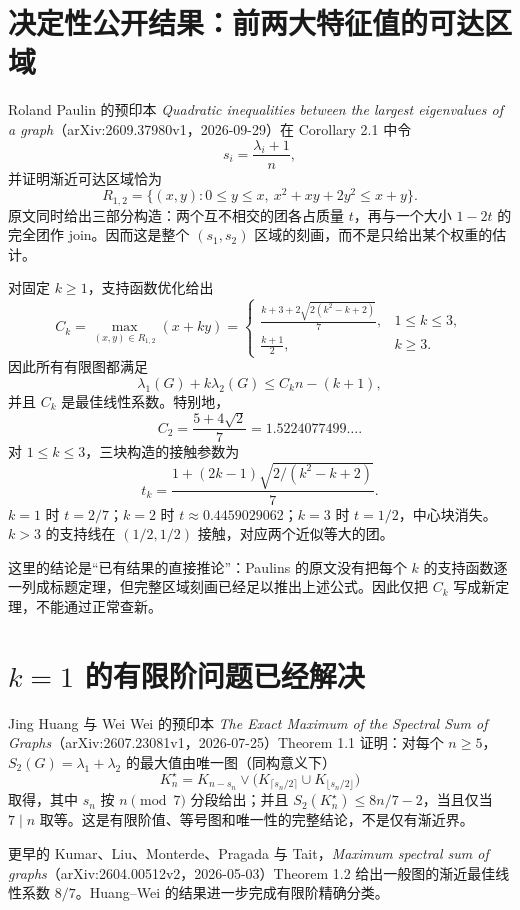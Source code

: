 \documentclass[11pt,a4paper]{article}
\begin{document}
\section{决定性公开结果：前两大特征值的可达区域}
Roland Paulin 的预印本 \emph{Quadratic inequalities between the largest eigenvalues of a graph}（arXiv:2609.37980v1，2026-09-29）在 Corollary 2.1 中令
\[
 s_i=\frac{\lambda_i+1}{n},
\]
并证明渐近可达区域恰为
\[
 R_{1,2}=\{(x,y):0\le y\le x,\ x^2+xy+2y^2\le x+y\}.
\]
原文同时给出三部分构造：两个互不相交的团各占质量 $t$，再与一个大小 $1-2t$ 的完全团作 join。因而这是整个 $(s_1,s_2)$ 区域的刻画，而不是只给出某个权重的估计。

对固定 $k\ge1$，支持函数优化给出
\[
 C_k=\max_{(x,y)\in R_{1,2}}(x+ky)=
 \begin{cases}
 \displaystyle\frac{k+3+2\sqrt{2(k^2-k+2)}}7,&1\le k\le3,\\[6pt]
 \displaystyle\frac{k+1}2,&k\ge3.
 \end{cases}
\]
因此所有有限图都满足
\[
 \lambda_1(G)+k\lambda_2(G)\le C_k n-(k+1),
\]
并且 $C_k$ 是最佳线性系数。特别地，
\[
 C_2=\frac{5+4\sqrt2}{7}=1.5224077499\ldots.
\]
对 $1\le k\le3$，三块构造的接触参数为
\[
 t_k=\frac{1+(2k-1)\sqrt{2/(k^2-k+2)}}7.
\]
$k=1$ 时 $t=2/7$；$k=2$ 时 $t\approx0.4459029062$；$k=3$ 时 $t=1/2$，中心块消失。$k>3$ 的支持线在 $(1/2,1/2)$ 接触，对应两个近似等大的团。

这里的结论是“已有结果的直接推论”：Paulins 的原文没有把每个 $k$ 的支持函数逐一列成标题定理，但完整区域刻画已经足以推出上述公式。因此仅把 $C_k$ 写成新定理，不能通过正常查新。

\section{$k=1$ 的有限阶问题已经解决}
Jing Huang 与 Wei Wei 的预印本 \emph{The Exact Maximum of the Spectral Sum of Graphs}（arXiv:2607.23081v1，2026-07-25）Theorem 1.1 证明：对每个 $n\ge5$，$S_2(G)=\lambda_1+\lambda_2$ 的最大值由唯一图（同构意义下）
\[
 K_n^\star=K_{n-s_n}\vee\bigl(K_{\lceil s_n/2\rceil}\cup K_{\lfloor s_n/2\rfloor}\bigr)
\]
取得，其中 $s_n$ 按 $n\pmod 7$ 分段给出；并且
$S_2(K_n^\star)\le 8n/7-2$，当且仅当 $7\mid n$ 取等。这是有限阶值、等号图和唯一性的完整结论，不是仅有渐近界。

更早的 Kumar、Liu、Monterde、Pragada 与 Tait，\emph{Maximum spectral sum of graphs}（arXiv:2604.00512v2，2026-05-03）Theorem 1.2 给出一般图的渐近最佳线性系数 $8/7$。Huang--Wei 的结果进一步完成有限阶精确分类。
\end{document}
